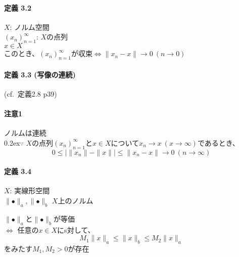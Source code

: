 \documentclass[12pt,a4paper]{article}
\begin{document}
      \paragraph{定義 3.2 \\}
        \noindent$X$: ノルム空間 \\
        ${(x_n)}_{n=1}^\infty$: $X$の点列 \\
        $x \in X$ \\
        このとき、${(x_n)}_{n=1}^\infty$が収束$\Leftrightarrow \parallel x_n - x \parallel \rightarrow 0 \ (n \rightarrow 0)$

      \paragraph{定義 3.3 (写像の連続)}
        (cf.\ 定義2.8 p39)
      \paragraph{注意1}
        ノルムは連続\\
        \raise0.2ex\hbox{\textcircled{\scriptsize{$\because$}}}
        $X$の点列${(x_n)}_{n=1}^\infty$と$x \in X$について$x_n \rightarrow x \ (x \rightarrow \infty)$であるとき、
        \[ 0 \leq \mid \parallel x_n \parallel - \parallel x \parallel \mid \leq \parallel x_n -  x\parallel \rightarrow 0 \ (n \rightarrow \infty) \]
      \paragraph{定義 3.4 \\}
        $X$: 実線形空間 \\
        $\parallel \bullet \parallel_a, \parallel \bullet \parallel_b$ $X$上のノルム 

        $\parallel \bullet \parallel_a$と$\parallel\bullet\parallel_b$が等価 \\
        $\Leftrightarrow$ 任意の$x \in X$にs対して、
        \[ M_1 \parallel x \parallel_a \leq \parallel x \parallel_b \leq M_2 \parallel x \parallel_a \]
        をみたす$M_1, M_2 > 0$が存在
\end{document}
